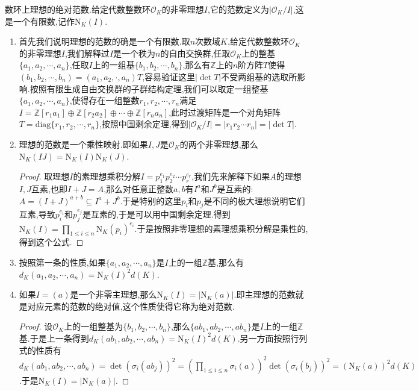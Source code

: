 数环上理想的绝对范数.给定代数整数环$\mathscr{O}_K$的非零理想$I$,它的范数定义为$|\mathscr{O}_K/I|$,这是一个有限数,记作$\mathrm{N}_K(I)$.
\begin{enumerate}
	\item 首先我们说明理想的范数的确是一个有限数.取$n$次数域$K$,给定代数整数环$\mathscr{O}_K$的非零理想$I$,我们解释过$I$是一个秩为$n$的自由交换群,任取$\mathscr{O}_K$上的整基$\{a_1,a_2,\cdots,a_n\}$,任取$I$上的一组基$\{b_1,b_2,\cdots,b_n\}$,那么有$\mathbb{Z}$上的$n$阶方阵$T$使得$(b_1,b_2,\cdots,b_n)=(a_1,a_2,\cdot,a_n)T$,容易验证这里$|\det T|$不受两组基的选取所影响.按照有限生成自由交换群的子群结构定理,我们可以取定一组整基$\{a_1,a_2,\cdots,a_n\}$,使得存在一组整数$r_1,r_2,\cdots,r_n$满足$I=\mathbb{Z}[r_1a_1]\oplus\mathbb{Z}[r_2a_2]\oplus\cdots\oplus\mathbb{Z}[r_na_n]$,此时过渡矩阵是一个对角矩阵$T=\mathrm{diag}\{r_1,r_2,\cdots,r_n\}$,按照中国剩余定理,得到$|\mathscr{O}_K/I|=|r_1r_2\cdots r_n|=|\det T|$.
	\item 理想的范数是一个乘性映射.即如果$I,J$是$\mathscr{O}_K$的两个非零理想,那么$\mathrm{N}_K(IJ)=\mathrm{N}_K(I)\mathrm{N}_K(J)$.
	\begin{proof}
		
		取理想$I$的素理想乘积分解$I=p_1^{e_1}p_2^{e_2}\cdots p_r^{e_r}$,我们先来解释下如果$A$的理想$I,J$互素,也即$I+J=A$,那么对任意正整数$a,b$有$I^a$和$J^b$是互素的:$A=(I+J)^{a+b}\subseteq I^a+J^b$.于是特别的这里$p_i$和$p_j$是不同的极大理想说明它们互素,导致$p_i^{e_i}$和$p_j^{e_j}$是互素的,于是可以用中国剩余定理.得到$\mathrm{N}_K(I)=\prod_{1\le i\le n}\mathrm{N}_K(p_i)^{e_i}$.于是按照非零理想的素理想乘积分解是乘性的,得到这个公式.
	\end{proof}
    \item 按照第一条的性质,如果$\{a_1,a_2,\cdots,a_n\}$是$I$上的一组$\mathbb{Z}$基,那么有$d_K(a_1,a_2,\cdots,a_n)=\mathrm{N}_K(I)^2d(K)$.
    \item 如果$I=(a)$是一个非零主理想,那么$\mathrm{N}_K(I)=|\mathrm{N}_K(a)|$.即主理想的范数就是对应元素的范数的绝对值,这个性质使得它称为绝对范数.
    \begin{proof}
    	
    	设$\mathscr{O}_K$上的一组整基为$\{b_1,b_2,\cdots,b_n\}$,那么$\{ab_1,ab_2,\cdots,ab_n\}$是$I$上的一组$\mathbb{Z}$基.于是上一条得到$d_K(ab_1,ab_2,\cdots,ab_n)=\mathrm{N}_K(I)^2d(K)$.另一方面按照行列式的性质有$d_K(ab_1,ab_2,\cdots,ab_n)=\det(\sigma_i(ab_j))^2=\left(\prod_{1\le i\le n}\sigma_i(a)\right)^2\det(\sigma_i(b_j))^2=(\mathrm{N}_K(a))^2d(K)$.于是$\mathrm{N}_K(I)=|\mathrm{N}_K(a)|$.
    \end{proof}
\end{enumerate}
\newpage
